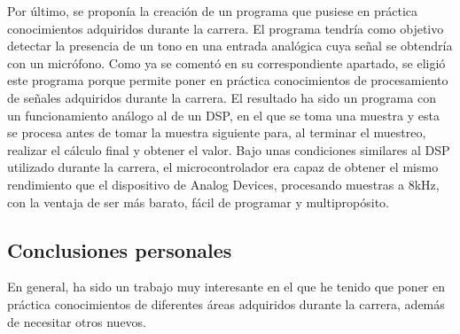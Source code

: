 Por último, se proponía la creación de un programa que pusiese en práctica conocimientos adquiridos durante la carrera. El programa tendría como objetivo detectar la presencia de un tono en una entrada analógica cuya señal se obtendría con un micrófono. Como ya se comentó en su correspondiente apartado, se eligió este programa porque permite poner en práctica conocimientos de procesamiento de señales adquiridos durante la carrera. El resultado ha sido un programa con un funcionamiento análogo al de un DSP, en el que se toma una muestra y esta se procesa antes de tomar la muestra siguiente para, al terminar el muestreo, realizar el cálculo final y obtener el valor. Bajo unas condiciones similares al DSP utilizado durante la carrera, el microcontrolador era capaz de obtener el mismo rendimiento que el dispositivo de Analog Devices, procesando muestras a 8kHz, con la ventaja de ser más barato, fácil de programar y multipropósito.

\subsection{Conclusiones personales}

En general, ha sido un trabajo muy interesante en el que he tenido que poner en práctica conocimientos de diferentes áreas adquiridos durante la carrera, además de necesitar otros nuevos.


